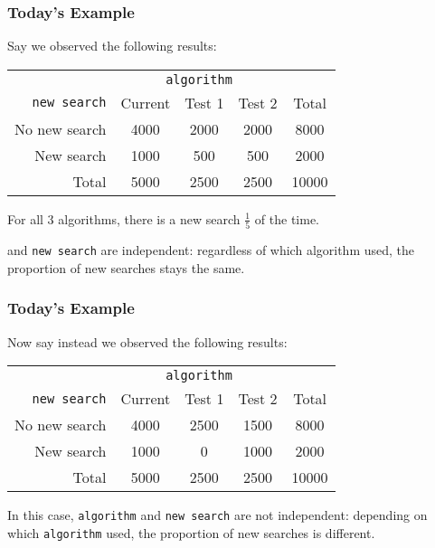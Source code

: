 \documentclass[handout]{beamer}
\newcommand{\blue}[1]{\textcolor{blue2}{#1}}
\begin{document}
\begin{frame}
\frametitle{Today's Example}

Say we observed the following results:

\begin{center}
  \begin{tabular}{r|ccc|c}
& \multicolumn{3}{c|}{{\tt algorithm}} & \\
       {\tt new search} & Current & Test 1 & Test 2 & Total \\ 
\hline
    No new search & 4000 & 2000 & 2000 & 8000 \\ 
    New search & 1000 & 500 & 500 & 2000 \\ 
\hline
    Total & 5000 & 2500 & 2500 & 10000 \\ 
  \end{tabular}
\end{center}

\pause For all 3 algorithms, there is a new search $\frac{1}{5}$ of the time.

\vspace{0.25cm}

 and {\tt new search} are \blue{independent}: regardless of which algorithm used, the proportion of new searches stays the same.

\end{frame}


\begin{frame}
\frametitle{Today's Example}

Now say instead we observed the following results:

\begin{center}
  \begin{tabular}{r|ccc|c}
& \multicolumn{3}{c|}{{\tt algorithm}} & \\
       {\tt new search} & Current & Test 1 & Test 2 & Total \\ 
\hline
    No new search & 4000 & 2500 & 1500 & 8000 \\ 
    New search & 1000 & 0 & 1000 & 2000 \\ 
\hline
    Total & 5000 & 2500 & 2500 & 10000 \\ 
  \end{tabular}
\end{center}

\vspace{0.25cm}

\pause In this case, {\tt algorithm} and {\tt new search} are \blue{not independent}: \blue{depending on} which {\tt algorithm} used, the proportion of new searches \blue{is different}.

\end{frame}
\end{document}
